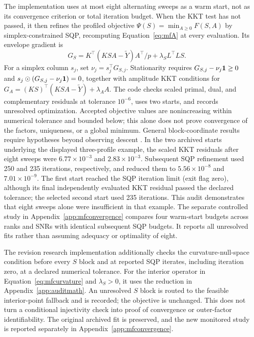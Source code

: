 The implementation uses at most eight alternating sweeps as a warm start, not as its convergence criterion or total iteration budget. When the KKT test has not passed, it then refines the profiled objective $\Psi(S)=\min_{A\geq0}F(S,A)$ by simplex-constrained SQP, recomputing Equation~\eqref{eq:mfA} at every evaluation. Its envelope gradient is
\begin{equation}\label{eq:mfgrad}
 G_S=K^\top(KSA-\widetilde Y)A^\top/p+\lambda_SL^\top LS.
\end{equation}
For a simplex column $s_j$, set $\nu_j=s_j^\top G_{S,j}$. Stationarity requires $G_{S,j}-\nu_j\mathbf{1}\geq0$ and $s_j\odot(G_{S,j}-\nu_j\mathbf{1})=0$, together with amplitude KKT conditions for $G_A=(KS)^\top(KSA-\widetilde Y)+\lambda_AA$. The code checks scaled primal, dual, and complementary residuals at tolerance $10^{-6}$, uses two starts, and records unresolved optimization. Accepted objective values are nonincreasing within numerical tolerance and bounded below; this alone does not prove convergence of the factors, uniqueness, or a global minimum. General block-coordinate results require hypotheses beyond observing descent \cite{tseng}. In the two archived starts underlying the displayed three-profile example, the scaled KKT residuals after eight sweeps were $6.77\times10^{-3}$ and $2.83\times10^{-3}$. Subsequent SQP refinement used 250 and 235 iterations, respectively, and reduced them to $5.56\times10^{-8}$ and $7.01\times10^{-9}$. The first start reached the SQP iteration limit (exit flag zero), although its final independently evaluated KKT residual passed the declared tolerance; the selected second start used 235 iterations. This audit demonstrates that eight sweeps alone were insufficient in that example. The separate controlled study in Appendix~\ref{app:mfconvergence} compares four warm-start budgets across ranks and SNRs with identical subsequent SQP budgets. It reports all unresolved fits rather than assuming adequacy or optimality of eight.


The revision research implementation additionally checks the curvature-null-space
condition before every $S$ block and at reported SQP iterates, including
iteration zero, at a
declared numerical tolerance. For the interior operator in Equation~\eqref{eq:mfcurvature}
and $\lambda_S>0$, it uses the reduction in Appendix~\ref{app:auditmath}.
An unresolved $S$ block is routed to the feasible interior-point fallback and is
recorded; the objective is unchanged. This does not turn a conditional
injectivity check into proof of convergence or outer-factor identifiability.
The original archived fit is preserved, and the new monitored study is
reported separately in Appendix~\ref{app:mfconvergence}.

